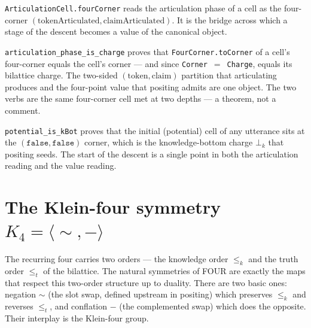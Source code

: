 \begin{definition}\label{def:cell-fourcorner}\leanok{}
\texttt{ArticulationCell.fourCorner} reads the articulation phase of a cell as the four-corner $(\text{tokenArticulated}, \text{claimArticulated})$. It is the bridge across which a stage of the descent becomes a value of the canonical object.
\end{definition}

\begin{theorem}\label{thm:articulation-phase-is-charge}\leanok{}
\texttt{articulation\_phase\_is\_charge} proves that \texttt{FourCorner.toCorner} of a cell's four-corner equals the cell's corner --- and since \texttt{Corner}~$=$~\texttt{Charge}, equals its bilattice charge. The two-sided $(\text{token}, \text{claim})$ partition that articulating produces and the four-point value that positing admits are one object. The two verbs are the same four-corner cell met at two depths --- a theorem, not a comment.
\end{theorem}

\begin{theorem}\label{thm:potential-is-kbot}\leanok{}
\texttt{potential\_is\_kBot} proves that the initial (potential) cell of any utterance sits at the $(\texttt{false}, \texttt{false})$ corner, which is the knowledge-bottom charge $\bot_k$ that positing seeds. The start of the descent is a single point in both the articulation reading and the value reading.
\end{theorem}

\section{The Klein-four symmetry $K_4 = \langle{\sim},{-}\rangle$}

The recurring four carries two orders --- the knowledge order $\leq_k$ and the truth order $\leq_t$ of the bilattice. The natural symmetries of FOUR are exactly the maps that respect this two-order structure up to duality. There are two basic ones: negation $\sim$ (the slot swap, defined upstream in positing) which preserves $\leq_k$ and reverses $\leq_t$, and conflation $-$ (the complemented swap) which does the opposite. Their interplay is the Klein-four group.

